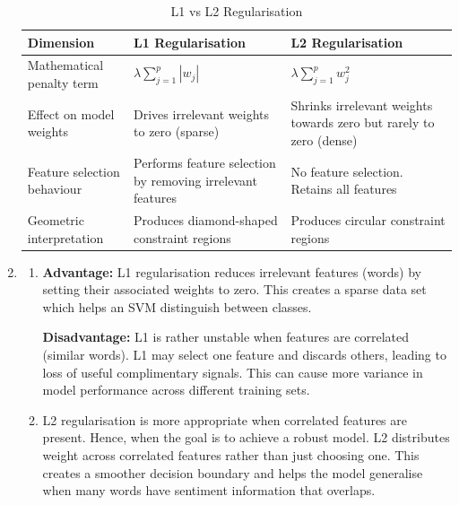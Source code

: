 \begin{enumerate}[label=\textbf{(\alph*)}, leftmargin=*, align=left]
            \begin{table}[htbp]
            \caption{L1 vs L2 Regularisation}
            \centering
            \begin{tabularx}{\columnwidth}{p{5.2cm}YY}
            \hline
            \textbf{Dimension} & \textbf{L1 Regularisation} & \textbf{L2 Regularisation} \\
            \hline
            Mathematical penalty term    
            & \(\lambda \sum_{j=1}^{p} |w_j|\) 
            & \(\lambda \sum_{j=1}^{p} w_j^2\) \\
            Effect on model weights      
            & Drives irrelevant weights to zero (sparse) 
            & Shrinks irrelevant weights towards zero but rarely to zero (dense) \\
            Feature selection behaviour  
            & Performs feature selection by removing irrelevant features 
            & No feature selection. Retains all features \\
            Geometric interpretation     
            & Produces diamond-shaped constraint regions 
            & Produces circular constraint regions \\
            \hline
            \end{tabularx}
            \label{reg_comp}
            \end{table}

    \item   \begin{enumerate}[label=\roman*., topsep=0pt, itemsep=2pt]
                \item \textbf{Advantage:} L1 regularisation reduces irrelevant features (words) by setting their associated weights to zero. This creates a sparse data set which helps an SVM distinguish between
                      classes.

                      \textbf{Disadvantage:} L1 is rather unstable when features are correlated (similar words). L1 may select one feature and discards others, leading to loss of useful complimentary signals.
                      This can cause more variance in model performance across different training sets.
                    
                \item L2 regularisation is more appropriate when correlated features are present. Hence, when the goal is to achieve a robust model. L2 distributes weight across correlated features rather
                      than just choosing one. This creates a smoother decision boundary and helps the model generalise when many words have sentiment information that overlaps.
            \end{enumerate}
    
\end{enumerate}

